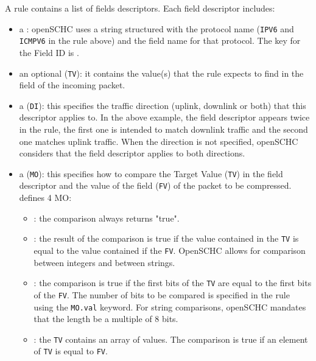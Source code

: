 A rule contains a list of fields descriptors. Each field descriptor includes:
\begin{itemize}
    \item a : openSCHC uses a string structured with the protocol name (\texttt{IPV6} and \texttt{ICMPV6} in the rule above) and the field name for that protocol. The key for the Field ID is \texttt{}.

    \item an optional  (\texttt{TV}): it contains the value(s) that the rule expects to find in the field of the incoming packet.

    \item a  (\texttt{DI}): this specifies the traffic direction (uplink, downlink or both) that this descriptor applies to. In the above example, the  field descriptor appears twice in the rule, the first one is intended to match downlink traffic and the second one matches uplink traffic. When the direction is not specified, openSCHC considers that the field descriptor applies to both directions.

    \item a  (\texttt{MO}): this specifies how to compare the Target Value (\texttt{TV}) in the field descriptor and the value of the field (\texttt{FV}) of the packet to be compressed.  defines 4 MO:

    \begin{itemize}
    \item \texttt{}: the comparison always returns "true".
    \item \texttt{}: the result of the comparison is true if the value contained in the \texttt{TV} is equal to the value contained if the \texttt{FV}. OpenSCHC allows for comparison between integers and between strings.
    \item \texttt{}: the comparison is true if the first bits of the \texttt{TV} are equal to the first bits of the \texttt{FV}. The number of bits to be compared is specified in the rule using the \texttt{MO.val} keyword. For string comparisons, openSCHC mandates that the length be a  multiple of 8 bits.
    \item \texttt{}: the \texttt{TV} contains an array of values. The comparison is true if an element of \texttt{TV} is equal to \texttt{FV}.
    \end{itemize}


\end{itemize}
